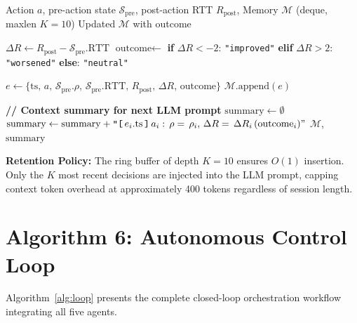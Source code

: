 \begin{algorithm}[H]
\caption{Agent Memory: Update and Context Summarisation}
\label{alg:memory}
\begin{algorithmic}[1]
\Require Action $a$, pre-action state $\mathcal{S}_{\text{pre}}$, post-action RTT $R_{\text{post}}$, Memory $\mathcal{M}$ (deque, maxlen $K=10$)
\Ensure Updated $\mathcal{M}$ with outcome

\State $\Delta R \gets R_{\text{post}} - \mathcal{S}_{\text{pre}}.\text{RTT}$ 
\State $\text{outcome} \gets$ \textbf{if} $\Delta R < -2$: \texttt{"improved"} \textbf{elif} $\Delta R > 2$: \texttt{"worsened"} \textbf{else}: \texttt{"neutral"}

\State $e \gets \{\text{ts},\, a,\, \mathcal{S}_{\text{pre}}.\rho,\, \mathcal{S}_{\text{pre}}.\text{RTT},\, R_{\text{post}},\, \Delta R,\, \text{outcome}\}$
\State $\mathcal{M}.\text{append}(e)$ 

\State \textbf{// Context summary for next LLM prompt}
\State $\text{summary} \gets \emptyset$
  \State $\text{summary} \gets \text{summary} + \texttt{"[}\,e_i.\text{ts}\,\texttt{]}\,a_i:\,\rho=\,\rho_i,\,\Delta R=\,\Delta R_i\,(\text{outcome}_i)"$
\EndFor
\Return $\mathcal{M}$, $\text{summary}$
\end{algorithmic}
\end{algorithm}

\textbf{Retention Policy:} The ring buffer of depth $K = 10$ ensures $O(1)$ insertion. Only the $K$ most recent decisions are injected into the LLM prompt, capping context token overhead at approximately 400 tokens regardless of session length.

\section{Algorithm 6: Autonomous Control Loop}

Algorithm~\ref{alg:loop} presents the complete closed-loop orchestration workflow integrating all five agents.

